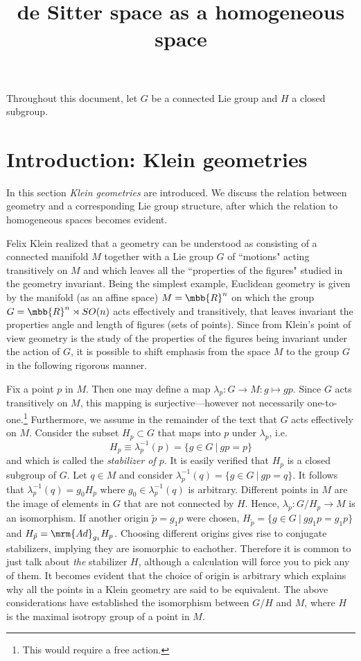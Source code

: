 \documentclass[11pt]{article}
\title{de Sitter space as a homogeneous space}
\date{}
\begin{document}
\maketitle

Throughout this document, let $G$ be a connected Lie group and 
$H$ a closed subgroup.

\section{Introduction: Klein geometries}

In this section \emph{Klein geometries} are introduced. We 
discuss the relation between geometry and a corresponding Lie 
group structure, after which the relation to homogeneous spaces 
becomes evident.

Felix Klein realized that a geometry can be understood as 
consisting of a connected manifold $M$ together with a Lie group 
$G$ of ``motions" acting transitively on $M$ and which leaves all 
the ``properties of the figures" studied in the geometry 
invariant.  Being the simplest example, Euclidean geometry is 
given by the manifold (as an affine space) $M = \mbb{R}^n$ on 
which the group $G = \mbb{R}^n \rtimes SO(n)$ acts effectively 
and transitively, that leaves invariant the properties angle and 
length of figures (sets of points).  Since from Klein's point of 
view geometry is the study of the properties of the figures being 
invariant under the action of $G$, it is possible to shift 
emphasis from the space $M$ to the group $G$ in the following 
rigorous manner.

Fix a point $p$ in $M$. Then one may define a map $\lambda_p : G 
\to M : g \mapsto gp$. Since $G$ acts transitively on $M$, this 
mapping is surjective---however not necessarily 
one-to-one.\footnote{This would require a free action.}  
Furthermore, we assume in the remainder of the text that $G$ acts 
effectively on $M$. Consider the subset $H_p \subset G$ that maps 
into $p$ under $\lambda_p$, i.e.\
%
\begin{equation}
	H_p \equiv \lambda^{-1}_p(p) = \{g \in G~|~gp = p \}
\end{equation}
%
and which is called the \emph{stabilizer of $p$}. It is easily 
verified that $H_p$ is a closed subgroup of $G$. Let $q \in M$ 
and consider $\lambda^{-1}_p(q) = \{ g \in G~|~gp = q \}$. It 
follows that $\lambda^{-1}_p(q) = g_0 H_p$ where $g_0 \in 
\lambda^{-1}_p(q)$ is arbitrary. Different points in $M$ are the 
image of elements in $G$ that are not connected by $H$. Hence, 
$\lambda_p : G/H_p \to M$ is an isomorphism.  If another origin 
$\tilde{p} = g_1 p$ were chosen, $H_{\tilde{p}} = \{ g \in 
	G~|~gg_1p= g_1p \}$ and $H_{\tilde{p}} = \mrm{Ad}_{g_1}H_p$.  
Choosing different origins gives rise to conjugate stabilizers, 
implying they are isomorphic to eachother. Therefore it is common 
to just talk about \emph{the} stabilizer $H$, although a 
calculation will force you to pick any of them. It becomes 
evident that the choice of origin is arbitrary which explains why 
all the points in a Klein geometry are said to be equivalent. The 
above considerations have established the isomorphism between 
$G/H$ and $M$, where $H$ is the maximal isotropy group of a point 
in $M$.
\end{document}
